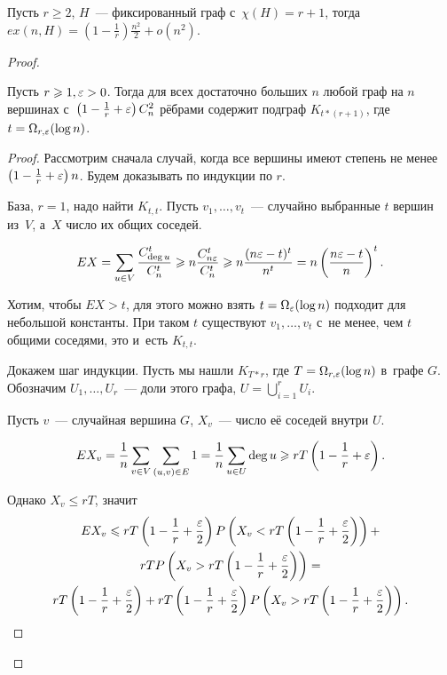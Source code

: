 \documentclass{article}
\begin{document}
\begin{theorem}
	Пусть $r \ge 2$, $H$~--- фиксированный граф с~$\chi(H) = r + 1$, тогда
	$ex(n, H) = \left(1 - \frac{1}{r}\right) \frac{n^2}{2} + o(n^2)$.
\end{theorem}
\begin{proof}
	\begin{lemma}
		Пусть $r \geqslant 1, \varepsilon > 0$. Тогда для всех достаточно больших $n$ любой граф
		на $n$ вершинах с~$\left(1 - \frac{1}{r} + \varepsilon\right)C_n^2$ рёбрами
		содержит подграф $K_{t \ast (r + 1)}$, где $t = \Omega_{r,\varepsilon}(\log n)$.
	\end{lemma}
	\begin{proof}
		Рассмотрим сначала случай, когда все вершины имеют степень не менее $\left(1
		- \frac{1}{r} + \varepsilon\right)n$. Будем доказывать по индукции по $r$.

		База, $r = 1$, надо найти $K_{t,t}$. Пусть $v_1, \ldots, v_t$~--- случайно
		выбранные $t$ вершин из~$V$, а~$X$ число их общих соседей.

		$$EX = \sum\limits_{u \in V} \frac{C_{\deg u}^t}{C_n^t} \geqslant n
		\frac{C_{n\varepsilon}^t}{C_n^t} \geqslant n \frac{(n\varepsilon - t)^t}{n^t} = n \left(
		\frac{n\varepsilon - t}{n}\right)^t.$$

		Хотим, чтобы $EX > t$, для этого можно взять $t = \Omega_\varepsilon(\log n)$
		подходит для небольшой константы. При таком $t$ существуют $v_1, \ldots,
		v_t$ с~не менее, чем $t$ общими соседями, это и~есть $K_{t,t}$.

		Докажем шаг индукции. Пусть мы нашли $K_{T \ast r}$, где $T =
		\Omega_{r,\varepsilon}(\log n)$ в~графе $G$. Обозначим $U_1, \ldots, U_r$~--- доли
		этого графа, $U = \bigcup\limits_{i=1}^{r} U_i$.

		Пусть $v$~--- случайная вершина $G$, $X_v$~--- число её соседей внутри $U$.

		$$ E X_v = \frac{1}{n} \sum\limits_{v \in V} \sum\limits_{(u,v) \in E} 1 =
		\frac{1}{n} \sum\limits_{u \in U} \deg u \geqslant rT \left(1 - \frac{1}{r} +
		\varepsilon\right).$$

		Однако $X_v \le rT$, значит
		\begin{multline*}
		EX_v \leqslant rT\left(1 - \frac{1}{r} + \frac{\varepsilon}{2}\right)
		P\left(X_v < rT \left(1 - \frac{1}{r} + \frac{\varepsilon}{2}\right)\right) +\\
		rTP\left(X_v > rT \left(1 - \frac{1}{r} + \frac{\varepsilon}{2}\right)\right) =\\
		rT\left(1 - \frac{1}{r} + \frac{\varepsilon}{2}\right) +
		rT\left(1 - \frac{1}{r} + \frac{\varepsilon}{2}\right)
		P\left( X_v > rT \left(1 - \frac{1}{r} + \frac{\varepsilon}{2}\right) \right).
		\end{multline*}


\end{proof}
\end{proof}
\end{document}
